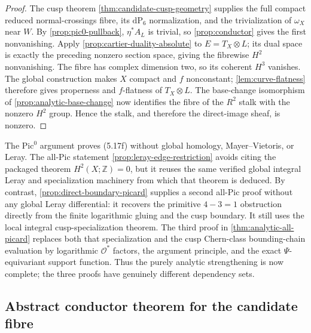 \begin{proof}
The cusp theorem \cref{thm:candidate-cusp-geometry} supplies the full compact
reduced normal-crossings fibre, its $\mathrm{dP}_6$ normalization, and the
trivialization of $\omega_X$ near $W$.  By
\cref{prop:pic0-pullback}, $\eta^*A_L$ is trivial, so
\cref{prop:conductor} gives the first nonvanishing.  Apply
\cref{prop:cartier-duality-absolute} to $E=T_X\otimes L$; its dual space is
exactly the preceding nonzero section space, giving the fibrewise $H^2$
nonvanishing.  The fibre has complex dimension two, so its coherent
$H^3$ vanishes.  The global construction makes $X$ compact and $f$
nonconstant; \cref{lem:curve-flatness} therefore gives properness and
$f$-flatness of $T_X\otimes L$.  The base-change isomorphism of
\cref{prop:analytic-base-change} now identifies the fibre of the $R^2$
stalk with the nonzero $H^2$ group.  Hence the stalk, and therefore the
direct-image sheaf, is nonzero.
\end{proof}

\begin{remark}
The Pic$^0$ argument proves (5.17f) without global homology,
Mayer--Vietoris, or Leray.  The all-Pic statement
\cref{prop:leray-edge-restriction} avoids citing the packaged theorem
$H^2(X;\mathbb Z)=0$, but it reuses the same verified global integral
Leray and specialization machinery from which that theorem is deduced.
By contrast, \cref{prop:direct-boundary-picard} supplies a second all-Pic
proof without any global Leray differential: it recovers the primitive
$4-3=1$ obstruction directly from the finite logarithmic gluing and the
cusp boundary.  It still uses the local integral cusp-specialization
theorem.  The third proof in \cref{thm:analytic-all-picard} replaces both
that specialization and the cusp Chern-class bounding-chain evaluation by
logarithmic $\mathcal O^*$ factors, the argument principle, and the exact
$\Psi$-equivariant support function.  Thus the purely analytic
strengthening is now complete; the three proofs have genuinely different
dependency sets.
\end{remark}

\subsection{Abstract conductor theorem for the candidate fibre}

